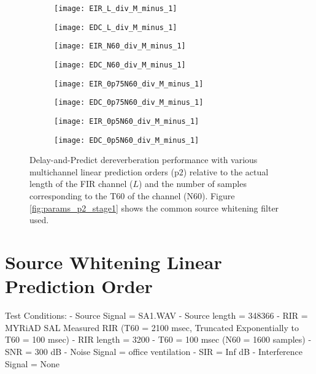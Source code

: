 \begin{figure}[H]
	\centering
	\begin{subfigure}[b]{0.4\textwidth}
		\centering
		\texttt{[image: EIR\_L\_div\_M\_minus\_1]}
	\end{subfigure}
	\begin{subfigure}[b]{0.4\textwidth}
		\centering
		\texttt{[image: EDC\_L\_div\_M\_minus\_1]}
	\end{subfigure}
	\begin{subfigure}[b]{0.4\textwidth}
		\centering
		\texttt{[image: EIR\_N60\_div\_M\_minus\_1]}
	\end{subfigure}
	\begin{subfigure}[b]{0.4\textwidth}
		\centering
		\texttt{[image: EDC\_N60\_div\_M\_minus\_1]}
	\end{subfigure}
	\begin{subfigure}[b]{0.4\textwidth}
		\centering
		\texttt{[image: EIR\_0p75N60\_div\_M\_minus\_1]}
	\end{subfigure}
	\begin{subfigure}[b]{0.4\textwidth}
		\centering
		\texttt{[image: EDC\_0p75N60\_div\_M\_minus\_1]}
	\end{subfigure}
	\begin{subfigure}[b]{0.4\textwidth}
		\centering
		\texttt{[image: EIR\_0p5N60\_div\_M\_minus\_1]}
	\end{subfigure}
	\begin{subfigure}[b]{0.4\textwidth}
		\centering
		\texttt{[image: EDC\_0p5N60\_div\_M\_minus\_1]}
	\end{subfigure}
	\caption{Delay-and-Predict dereverberation performance with various multichannel linear prediction orders ($\mathrm{p2}$) relative to the actual length of the FIR channel ($L$) and the number of samples corresponding to the T60 of the channel ($\mathrm{N60}$). Figure \ref{fig:params_p2_stage1} shows the common source whitening filter used.}
	\label{fig:params_p2_compare}
\end{figure}

\section{Source Whitening Linear Prediction Order}


Test Conditions:
- Source Signal = SA1.WAV
- Source length = 348366
- RIR = MYRiAD SAL Measured RIR (T60 = 2100 msec, Truncated Exponentially to T60 = 100 msec)
- RIR length = 3200
- T60 = 100 msec (N60 = 1600 samples)
- SNR = 300 dB
- Noise Signal = office ventilation
- SIR = Inf dB
- Interference Signal = None

